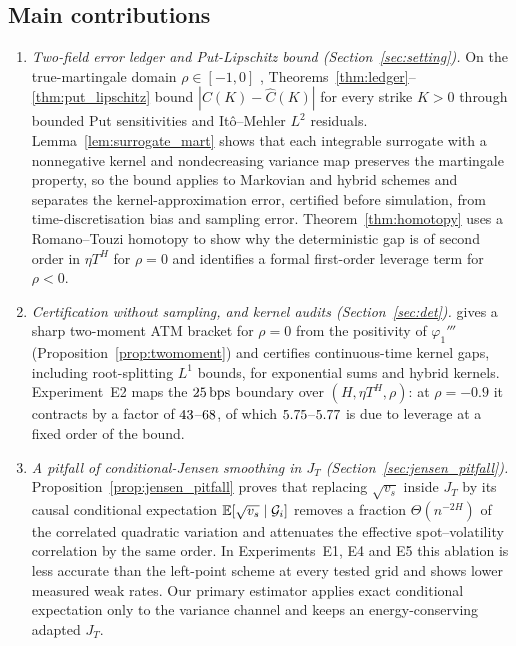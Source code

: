 \subsection*{Main contributions}

\begin{enumerate}[1.]
  \item \emph{Two-field error ledger and Put-Lipschitz bound (Section~\ref{sec:setting}).} On the true-martingale domain $\rho\in[-1,0]$ \citep{Gassiat2019}, Theorems~\ref{thm:ledger}--\ref{thm:put_lipschitz} bound $|C(K)-\hat{C}(K)|$ for every strike $K>0$ through bounded Put sensitivities and It\^o--Mehler $L^2$ residuals. Lemma~\ref{lem:surrogate_mart} shows that each integrable surrogate with a nonnegative kernel and nondecreasing variance map preserves the martingale property, so the bound applies to Markovian and hybrid schemes and separates the kernel-approximation error, certified before simulation, from time-discretisation bias and sampling error. Theorem~\ref{thm:homotopy} uses a Romano--Touzi homotopy to show why the deterministic gap is of second order in $\eta T^H$ for $\rho=0$ and identifies a formal first-order leverage term for $\rho<0$.
  \item \emph{Certification without sampling, and kernel audits (Section~\ref{sec:det}).} \RCDet{} gives a sharp two-moment ATM bracket for $\rho=0$ from the positivity of $\varphi_1'''$ (Proposition~\ref{prop:twomoment}) and certifies continuous-time kernel gaps, including root-splitting $L^1$ bounds, for \citet{BayerBreneis2023} exponential sums and \citet{BennedsenLundePakkanen2017} hybrid kernels. Experiment~E2 maps the $25\,\mathrm{bps}$ boundary over $(H,\eta T^H,\rho)$: at $\rho=-0.9$ it contracts by a factor of $43$--$68$, of which $5.75$--$5.77$ is due to leverage at a fixed order of the bound.
  \item \emph{A pitfall of conditional-Jensen smoothing in $J_T$ (Section~\ref{sec:jensen_pitfall}).} Proposition~\ref{prop:jensen_pitfall} proves that replacing $\sqrt{v_s}$ inside $J_T$ by its causal conditional expectation $\mathbb{E}[\sqrt{v_s}\mid\mathcal{G}_i]$ removes a fraction $\Theta(n^{-2H})$ of the correlated quadratic variation and attenuates the effective spot--volatility correlation by the same order. In Experiments~E1, E4 and E5 this ablation is less accurate than the left-point scheme at every tested grid and shows lower measured weak rates. Our primary estimator \RCCE{} applies exact conditional expectation only to the variance channel and keeps an energy-conserving adapted $J_T$.

\end{enumerate}
